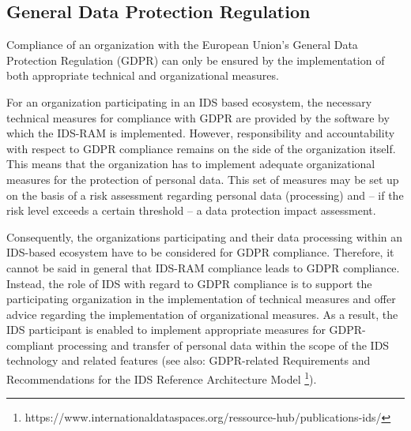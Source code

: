 
\subsection{General Data Protection Regulation}
\label{subsec:gdpr}

Compliance of an organization with the European Union’s General Data Protection Regulation (GDPR) can only be ensured by the implementation of both appropriate technical and organizational measures.

For an organization participating in an IDS based ecosystem, the necessary technical measures for compliance with GDPR are provided by the software by which the IDS-RAM is implemented. However, responsibility and accountability with respect to GDPR compliance remains on the side of the organization itself. This means that the organization has to implement adequate organizational measures for the protection of personal data. This set of measures may be set up on the basis of a risk assessment regarding personal data (processing) and – if the risk level exceeds a certain threshold – a data protection impact assessment.

Consequently, the organizations participating and their data processing within an IDS-based ecosystem have to be considered for GDPR compliance. Therefore, it cannot be said in general that IDS-RAM compliance leads to GDPR compliance. Instead, the role of IDS with regard to GDPR compliance is to support the participating organization in the implementation of technical measures and offer advice regarding the implementation of organizational measures. As a result, the IDS participant is enabled to implement appropriate measures for GDPR-compliant processing and transfer of personal data within the scope of the IDS technology and related features (see also: GDPR-related Requirements and Recommendations for the IDS Reference Architecture Model \footnote{https://www.internationaldataspaces.org/ressource-hub/publications-ids/}).



